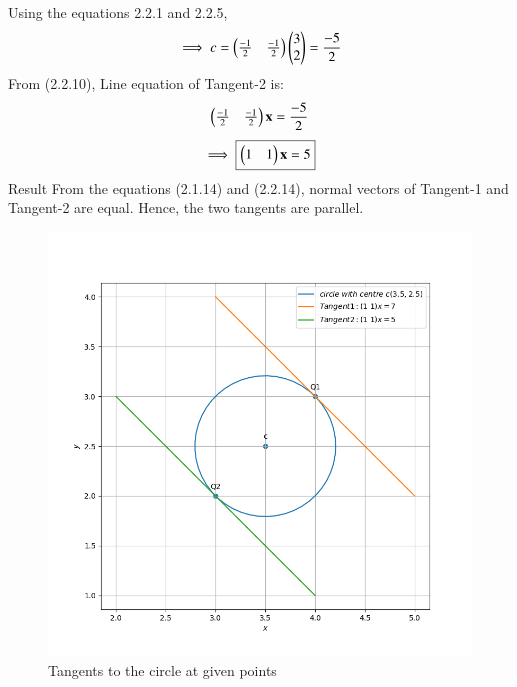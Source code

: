 Using the equations 2.2.1 and 2.2.5,
\begin{align}
 \implies c=\begin{pmatrix}\frac{-1}{2} & \frac{-1}{2}\end{pmatrix} \begin{pmatrix}3\\2\end{pmatrix}= \frac{-5}{2}
\end{align}
From (2.2.10), Line equation of Tangent-2 is:
\begin{align}
 \begin{pmatrix}\frac{-1}{2} & \frac{-1}{2}\end{pmatrix} \mathbf{x}= \frac{-5}{2}
\end{align}
\begin{align}
  \implies \boxed {\begin{pmatrix}1 & 1\end{pmatrix} \mathbf{x}= 5 }
\end{align}
{Result}
From the equations (2.1.14) and (2.2.14), normal vectors of Tangent-1 and Tangent-2 are equal. \newline 
\centering Hence, the two tangents are parallel.
\begin{figure}[h!]
	\centering
	\includegraphics[width=\columnwidth]{./solutions/4/2/9/Codes/A4.png}
	\caption{Tangents to the circle at given points}
	\label{eq:solutions/4/2/9/myfig}
\end{figure}
